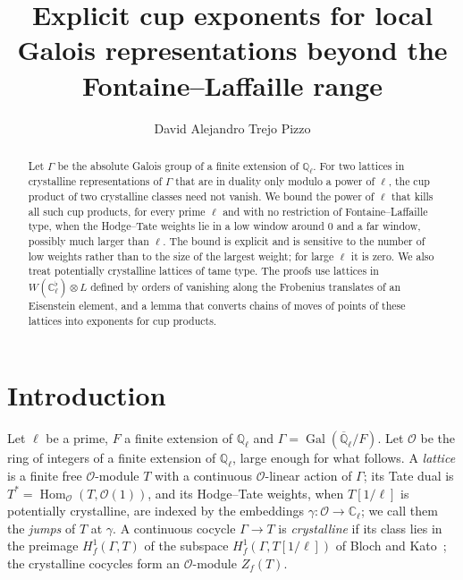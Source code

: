 \documentclass[10pt]{amsart}
\theoremstyle{definition}
\theoremstyle{remark}
\begin{document}
\addtolength{\abovedisplayskip}{-3.4pt}
\addtolength{\belowdisplayskip}{-3.4pt}
\addtolength{\belowdisplayshortskip}{-2pt}
\title[Explicit cup exponents]{Explicit cup exponents for local Galois representations beyond the Fontaine--Laffaille range}
\author{David Alejandro Trejo Pizzo}
\date{}
\begin{abstract}
Let $\Gamma$ be the absolute Galois group of a finite extension of $\mathbb Q_\ell$. For two
lattices in crystalline representations of $\Gamma$ that are in duality only modulo a power of
$\ell$, the cup product of two crystalline classes need not vanish. We bound the power of $\ell$
that kills all such cup products, for every prime $\ell$ and with no restriction of
Fontaine--Laffaille type, when the Hodge--Tate weights lie in a low window around $0$ and a far
window, possibly much larger than $\ell$. The bound is explicit and is sensitive to the number of
low weights rather than to the size of the largest weight; for large $\ell$ it is zero. We also
treat potentially crystalline lattices of tame type. The proofs use lattices in
$W(\mathbb C_\ell^\flat)\otimes L$ defined by orders of vanishing along the Frobenius translates of
an Eisenstein element, and a lemma that converts chains of moves of points of these lattices into
exponents for cup products.
\end{abstract}
\maketitle
\setcounter{tocdepth}{1}\tableofcontents

\section{Introduction}\label{C4:intro}

Let $\ell$ be a prime, $F$ a finite extension of $\mathbb Q_\ell$ and
$\Gamma=\operatorname{Gal}(\overline{\mathbb Q}_\ell/F)$. Let $\mathcal O$ be the ring of integers
of a finite extension of $\mathbb Q_\ell$, large enough for what follows. A \emph{lattice} is a
finite free $\mathcal O$-module $T$ with a continuous $\mathcal O$-linear action of $\Gamma$; its
Tate dual is $T^*=\operatorname{Hom}_{\mathcal O}(T,\mathcal O(1))$, and its Hodge--Tate weights,
when $T[1/\ell]$ is potentially crystalline, are indexed by the embeddings
$\gamma\colon\mathcal O\to\mathbb C_\ell$; we call them the \emph{jumps} of $T$ at $\gamma$. A
continuous cocycle $\Gamma\to T$ is \emph{crystalline} if its class lies in the preimage
$H^1_f(\Gamma,T)$ of the subspace $H^1_f(\Gamma,T[1/\ell])$ of Bloch and Kato~\cite{BlochKato};
the crystalline cocycles form an $\mathcal O$-module $Z_f(T)$.
\end{document}
